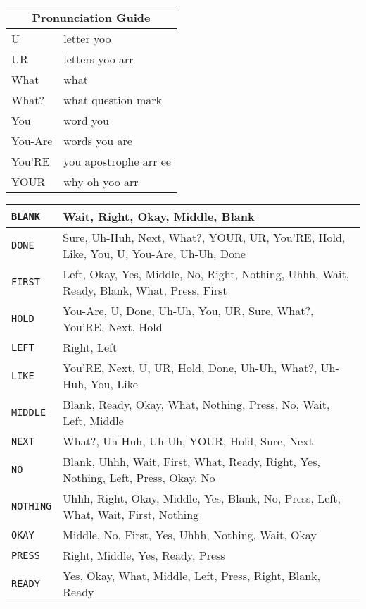 \documentclass[11pt]{article}
\begin{document}
\begin{multicols}{3}
\begin{tabular}{|l|l|}
\hline
\multicolumn{2}{|c|}{Pronunciation Guide} \\
\hline
U       & letter yoo \\
UR      & letters yoo arr \\
What    & what \\
What?   & what question mark \\
You     & word you \\
You-Are & words you are \\
You'RE  & you apostrophe arr ee \\
YOUR    & why oh yoo arr \\
\hline
\end{tabular}

\begin{tabular}{|l|p{3.75in}|}
\hline
\texttt{BLANK}   & Wait, Right, Okay, Middle, Blank \\ \hline
\texttt{DONE}    & Sure, Uh-Huh, Next, What?, YOUR, UR, You'RE, Hold, Like,
                   You, U, You-Are, Uh-Uh, Done \\ \hline
\texttt{FIRST}   & Left, Okay, Yes, Middle, No, Right, Nothing, Uhhh, Wait,
                   Ready, Blank, What, Press, First \\ \hline
\texttt{HOLD}    & You-Are, U, Done, Uh-Uh, You, UR, Sure, What?, You'RE, Next,
                   Hold \\ \hline
\texttt{LEFT}    & Right, Left \\ \hline
\texttt{LIKE}    & You'RE, Next, U, UR, Hold, Done, Uh-Uh, What?, Uh-Huh, You,
                   Like \\ \hline
\texttt{MIDDLE}  & Blank, Ready, Okay, What, Nothing, Press, No, Wait, Left,
                   Middle \\ \hline
\texttt{NEXT}    & What?, Uh-Huh, Uh-Uh, YOUR, Hold, Sure, Next \\ \hline
\texttt{NO}      & Blank, Uhhh, Wait, First, What, Ready, Right, Yes, Nothing,
                   Left, Press, Okay, No \\ \hline
\texttt{NOTHING} & Uhhh, Right, Okay, Middle, Yes, Blank, No, Press, Left,
                   What, Wait, First, Nothing \\ \hline
\texttt{OKAY}    & Middle, No, First, Yes, Uhhh, Nothing, Wait, Okay \\ \hline
\texttt{PRESS}   & Right, Middle, Yes, Ready, Press \\ \hline
\texttt{READY}   & Yes, Okay, What, Middle, Left, Press, Right, Blank, Ready \\

\end{tabular}
\end{multicols}
\end{document}
